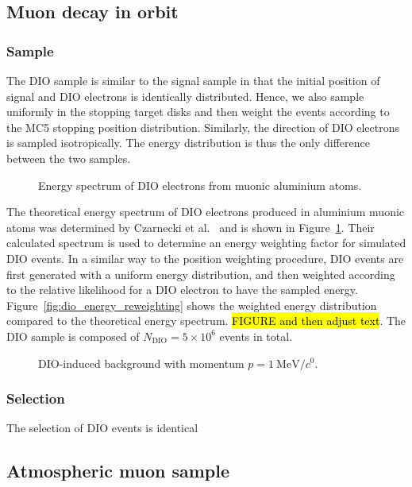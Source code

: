 \subsection{Muon decay in orbit}
\subsubsection{Sample}
The DIO sample is similar to the signal sample in that the initial position
of signal and DIO electrons is identically distributed. Hence, we also sample
uniformly in the stopping target disks and then weight the events according to
the MC5 stopping position distribution. Similarly, the direction of DIO
electrons is sampled isotropically. The energy distribution is thus the only
difference between the two samples. 

\begin{figure}
    \centering
    
    \caption{Energy spectrum of DIO electrons from muonic aluminium atoms.}
    \label{fig:czarnecki_spectrum}
\end{figure}

The theoretical energy spectrum of DIO electrons produced in aluminium muonic
atoms was determined by Czarnecki et al.~\cite{czarnecki} and is shown in
Figure~\ref{fig:czarnecki_spectrum}. Their calculated spectrum is used to
determine an energy weighting factor for simulated DIO events. In a similar way
to the position weighting procedure, DIO events are first generated with a
uniform energy distribution, and then weighted according to the relative
likelihood for a DIO electron to have the sampled energy.
Figure~\ref{fig:dio_energy_reweighting} shows the weighted energy distribution
compared to the theoretical energy spectrum. \hl{FIGURE and then adjust text}.
The DIO sample is composed of $N_\mathrm{DIO} = 5\times 10^6$ events in total.

\begin{figure}
    \centering
    
    \caption{DIO-induced background with momentum  $p=\SI{1}{\MeV/\clight}$.}
    \label{fig:muon_dio_in_cydet}
\end{figure}

\subsubsection{Selection}
The selection of DIO events is identical

\subsection{Atmospheric muon sample}

